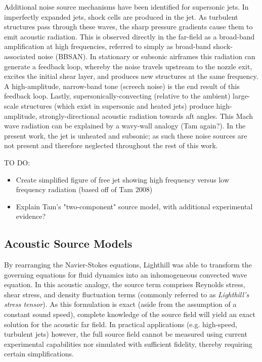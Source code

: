Additional noise source mechanisms have been identified for supersonic jets. In imperfectly expanded jets, shock cells are produced in the jet. As turbulent structures pass through these waves, the sharp pressure gradients cause them to emit acoustic radiation. 
This is observed directly in the far-field as a broad-band amplification at high frequencies, referred to simply as broad-band shock-associated noise (BBSAN). 
In stationary or subsonic airframes this radiation can generate a feedback loop, whereby the noise travels upstream to the nozzle exit, excites the initial shear layer, and produces new structures at the same frequency.
A high-amplitude, narrow-band tone (screech noise) is the end result of this feedback loop.
Lastly, supersonically-convecting (relative to the ambient) large-scale structures (which exist in supersonic and heated jets) produce high-amplitude, strongly-directional acoustic radiation towards aft angles.
This Mach wave radiation can be explained by a wavy-wall analogy (Tam again?).
In the present work, the jet is unheated and subsonic; as such these noise sources are not present and therefore neglected throughout the rest of this work.

TO DO:
	\begin{itemize}
		\item	Create simplified figure of free jet showing high frequency versus low frequency radiation (based off of Tam 2008)
		\item 	Explain Tam's "two-component" source model, with additional experimental evidence?
	\end{itemize}

\subsection{Acoustic Source Models}
By rearranging the Navier-Stokes equations, Lighthill \citep{Lighthill1952} was able to transform the governing equations for fluid dynamics into an inhomogeneous convected wave equation. 
In this acoustic analogy, the source term comprises Reynolds stress, shear stress, and density fluctuation terms (commonly referred to as \emph{Lighthill's stress tensor}).
As this formulation is exact (aside from the assumption of a constant sound speed), complete knowledge of the source field will yield an exact solution for the acoustic far field.
In practical applications (e.g. high-speed, turbulent jets) however, the full source field cannot be measured using current experimental capabilities nor simulated with sufficient fidelity, thereby requiring certain simplifications.
